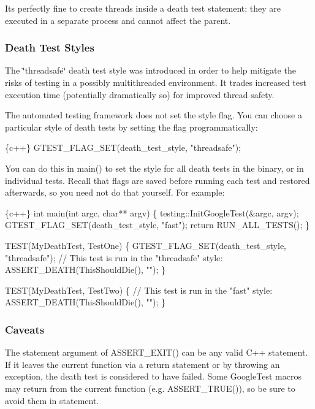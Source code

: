 It\textquotesingle{}s perfectly fine to create threads inside a death test statement; they are executed in a separate process and cannot affect the parent.

\subsubsection*{Death Test Styles}

The \char`\"{}threadsafe\char`\"{} death test style was introduced in order to help mitigate the risks of testing in a possibly multithreaded environment. It trades increased test execution time (potentially dramatically so) for improved thread safety.

The automated testing framework does not set the style flag. You can choose a particular style of death tests by setting the flag programmatically\+:


\begin{DoxyCode}
\{c++\}
GTEST\_FLAG\_SET(death\_test\_style, "threadsafe");
\end{DoxyCode}


You can do this in {\ttfamily main()} to set the style for all death tests in the binary, or in individual tests. Recall that flags are saved before running each test and restored afterwards, so you need not do that yourself. For example\+:


\begin{DoxyCode}
\{c++\}
int main(int argc, char** argv) \{
  testing::InitGoogleTest(&argc, argv);
  GTEST\_FLAG\_SET(death\_test\_style, "fast");
  return RUN\_ALL\_TESTS();
\}

TEST(MyDeathTest, TestOne) \{
  GTEST\_FLAG\_SET(death\_test\_style, "threadsafe");
  // This test is run in the "threadsafe" style:
  ASSERT\_DEATH(ThisShouldDie(), "");
\}

TEST(MyDeathTest, TestTwo) \{
  // This test is run in the "fast" style:
  ASSERT\_DEATH(ThisShouldDie(), "");
\}
\end{DoxyCode}


\subsubsection*{Caveats}

The {\ttfamily statement} argument of {\ttfamily A\+S\+S\+E\+R\+T\+\_\+\+E\+X\+I\+T()} can be any valid C++ statement. If it leaves the current function via a {\ttfamily return} statement or by throwing an exception, the death test is considered to have failed. Some Google\+Test macros may return from the current function (e.\+g. {\ttfamily A\+S\+S\+E\+R\+T\+\_\+\+T\+R\+U\+E()}), so be sure to avoid them in {\ttfamily statement}.

